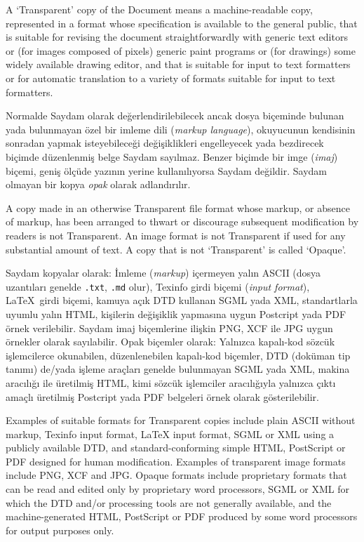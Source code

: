\begin{multicols}{2}
\begin{ingliz}
A `Transparent' copy of the Document means a machine-readable copy, represented in a
format whose specification is available to the general public, that is suitable for
revising the document straightforwardly with generic text editors or
(for images composed of pixels) generic paint programs or (for drawings)
some widely available drawing editor, and that is suitable for input to text
formatters or for automatic translation to a variety of formats suitable for
input to text formatters.
\end{ingliz}

Normalde Saydam olarak değerlendirilebilecek ancak dosya biçeminde bulunan yada bulunmayan
özel bir imleme dili (\emph{markup language}), okuyucunun kendisinin sonradan yapmak isteyebileceği değişiklikleri
engelleyecek yada bezdirecek biçimde düzenlenmiş belge Saydam sayılmaz.
Benzer biçimde bir imge (\emph{imaj}) biçemi, geniş ölçüde yazının yerine kullanılıyorsa Saydam değildir.
Saydam olmayan bir kopya \emph{opak} olarak adlandırılır.

\begin{ingliz}
A copy made in an otherwise Transparent file format
whose markup, or absence of markup, has been arranged to thwart or discourage
subsequent modification by readers is not Transparent.
An image format is not Transparent if used for any substantial amount of text.
A copy that is not `Transparent' is called `Opaque'.
\end{ingliz}

Saydam kopyalar olarak: İmleme (\emph{markup}) içermeyen yalın ASCII (dosya uzantıları genelde \texttt{.txt}, \texttt{.md}  olur), Texinfo girdi biçemi (\emph{input format}), \LaTeX\ girdi biçemi, kamuya açık DTD kullanan SGML yada XML, standartlarla uyumlu yalın HTML, kişilerin değişiklik yapmasına uygun Postcript yada PDF örnek verilebilir. Saydam imaj biçemlerine ilişkin PNG, XCF ile JPG uygun örnekler olarak sayılabilir. Opak biçemler olarak: Yalnızca kapalı-kod sözcük işlemcilerce okunabilen, düzenlenebilen kapalı-kod biçemler, DTD (doküman tip tanımı) de/yada işleme araçları genelde bulunmayan SGML yada XML, makina aracılığı ile üretilmiş HTML, kimi sözcük işlemciler aracılığıyla yalnızca çıktı amaçlı üretilmiş Postcript yada PDF belgeleri örnek olarak gösterilebilir.

\begin{ingliz}
Examples of suitable formats for Transparent copies
include plain ASCII without markup, Texinfo input format,
LaTeX input format, SGML or XML using a publicly available
DTD, and standard-conforming simple HTML,
PostScript or PDF designed for human
modification.  Examples of transparent image formats include
PNG, XCF and JPG. Opaque formats include proprietary formats
that can be read and edited only by proprietary word
processors, SGML or XML for which the DTD and/or processing
tools are not generally available, and the machine-generated
HTML, PostScript or PDF produced by
some word processors for output purposes only.
\end{ingliz}



\end{multicols}
